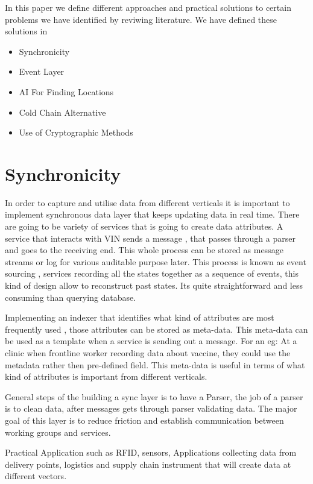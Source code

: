 \documentclass{article}
\begin{document}
In this paper we define different approaches and practical solutions to certain problems we have identified by reviwing literature. We have defined these solutions in 

\begin{itemize}
	\item Synchronicity
	\item Event Layer
	\item AI For Finding Locations
	\item Cold Chain Alternative
	\item Use of Cryptographic Methods
\end{itemize}




\section{Synchronicity}
In order to capture and utilise data from different verticals it is important to implement synchronous data layer that keeps updating data in real time. There are going to be variety of services that is going to create data attributes. A service that interacts with VIN sends a message , that passes through a parser and goes to the receiving end. This whole process can be stored as message streams or log for various auditable purpose later. This process is known as event sourcing , services recording all the states together as a sequence of events, this kind of design allow to reconstruct past states. Its quite straightforward and less consuming than querying database.

Implementing an indexer that identifies what kind of attributes are most frequently used , those attributes can be stored as meta-data. This meta-data can be used as a template when a service is sending out a message. For an eg: At a clinic when frontline worker recording data about vaccine, they could use the metadata rather then pre-defined field. This meta-data is useful in terms of what kind of attributes is important from different verticals.

General steps of the building a sync layer is to have a Parser, the job of a parser is to clean data, after messages gets through parser validating data. The major goal of this layer is to reduce friction and establish communication between working groups and services.

Practical Application such as RFID, sensors, Applications collecting data from delivery points, logistics and supply chain instrument that will create data at different vectors.
\end{document}
